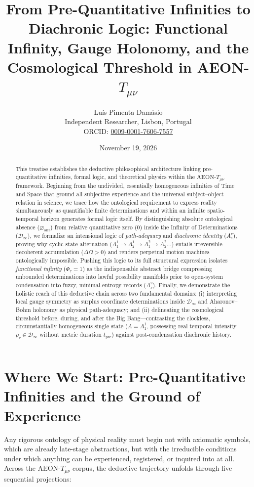 \documentclass[11pt,a4paper]{article}
\title{\textbf{From Pre-Quantitative Infinities to Diachronic Logic: Functional Infinity, Gauge Holonomy, and the Cosmological Threshold in AEON-$T_{\mu\nu}$}}
\author{Luís Pimenta Damásio\\
\small Independent Researcher, Lisbon, Portugal\\
\small ORCID: \href{https://orcid.org/0009-0001-7606-7557}{0009-0001-7606-7557}}
\date{November 19, 2026}
\begin{document}
\maketitle

\begin{abstract}
This treatise establishes the deductive philosophical architecture linking pre-quantitative infinities, formal logic, and theoretical physics within the $\text{AEON-}T_{\mu\nu}$ framework. Beginning from the undivided, essentially homogeneous infinities of Time and Space that ground all subjective experience and the universal subject--object relation in science, we trace how the ontological requirement to express reality simultaneously as quantifiable finite determinations and within an infinite spatio-temporal horizon generates formal logic itself. By distinguishing absolute ontological absence ($\varnothing_{\mathrm{ont}}$) from relative quantitative zero ($0$) inside the Infinity of Determinations ($\mathcal{D}_\infty$), we formalize an intensional logic of \emph{path-adequacy} and \emph{diachronic identity} ($A_s^v$), proving why cyclic state alternation ($A_1^1 \to A_2^1 \to A_1^2 \to A_2^2 \dots$) entails irreversible decoherent accumulation ($\Delta\Omega > 0$) and renders perpetual motion machines ontologically impossible. Pushing this logic to its full structural expression isolates \emph{functional infinity} ($\Phi_\tau = 1$) as the indispensable abstract bridge compressing unbounded determinations into lawful possibility manifolds prior to open-system condensation into fuzzy, minimal-entropy records ($A_s^v$). Finally, we demonstrate the holistic reach of this deductive chain across two fundamental domains: (i) interpreting local gauge symmetry as surplus coordinate determinations inside $\mathcal{D}_\infty$ and Aharonov--Bohm holonomy as physical path-adequacy; and (ii) delineating the cosmological threshold before, during, and after the Big Bang—contrasting the clockless, circumstantially homogeneous single state ($A = A_1^1$, possessing real temporal intensity $\rho_\tau \in \mathcal{D}_\infty$ without metric duration $t_{\mathrm{pre}}$) against post-condensation diachronic history.
\end{abstract}

\section{Where We Start: Pre-Quantitative Infinities and the Ground of Experience}

Any rigorous ontology of physical reality must begin not with axiomatic symbols, which are already late-stage abstractions, but with the irreducible conditions under which anything can be experienced, registered, or inquired into at all. Across the $\text{AEON-}T_{\mu\nu}$ corpus, the deductive trajectory unfolds through five sequential projections:
\end{document}

